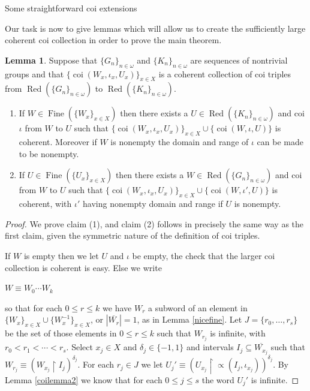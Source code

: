 \documentclass{amsart}
\theoremstyle{definition}\newtheorem{theorem}{Theorem}
\theoremstyle{definition}\newtheorem*{A}{Main Theorem}
\theoremstyle{definition}\newtheorem*{B}{Theorem \ref{elementaryequiv}}
\theoremstyle{definition}\newtheorem*{C}{Theorem \ref{continuous}}
\theoremstyle{definition}\newtheorem*{D}{Theorem \ref{bigisomorphism2}}
\theoremstyle{definition}\newtheorem{bigtheorem}{Main Theorem}
\numberwithin{theorem}{section}
\theoremstyle{definition}\newtheorem{corollary}[theorem]{Corollary}
\theoremstyle{definition}\newtheorem{proposition}[theorem]{Proposition}
\theoremstyle{definition}\newtheorem{definition}[theorem]{Definition}
\theoremstyle{definition}\newtheorem{question}[theorem]{Question}
\theoremstyle{definition}\newtheorem{example}[theorem]{Example}
\theoremstyle{definition}\newtheorem{remark}[theorem]{Remark}
\theoremstyle{definition}\newtheorem{note}[theorem]{Note}
\theoremstyle{definition}\newtheorem{lemma}[theorem]{Lemma}
\theoremstyle{definition}\newtheorem{fact}[theorem]{Fact}
\theoremstyle{definition}\newtheorem{define}[theorem]{Definition}
\theoremstyle{definition}\newtheorem{claim}[theorem]{Claim}
\theoremstyle{definition}\newtheorem{obs}[theorem]{Observation}
\theoremstyle{definition}\newtheorem{definitions}[theorem]{Definitions}
\newcommand{\Red}{\operatorname{Red}}
\newcommand{\Fine}{\operatorname{Fine}}
\newcommand{\coi}{\operatorname{coi}}
\begin{document}
\begin{section}{Some straightforward coi extensions}\label{uncomplicated}

Our task is now to give lemmas which will allow us to create the sufficiently large coherent coi collection in order to prove the main theorem.


\begin{lemma}\label{findsomerepresentative}  Suppose that $\{G_n\}_{n \in \omega}$ and $\{K_n\}_{n \in \omega}$ are sequences of nontrivial groups and that $\{\coi(W_x, \iota_x, U_x)\}_{x\in X}$ is a coherent collection of coi triples from $\Red(\{G_n\}_{n \in \omega})$ to $\Red(\{K_n\}_{n \in \omega})$.

\begin{enumerate}
\item  If $W \in \Fine(\{W_x\}_{x\in X})$ then there exists a $U \in \Red(\{K_n\}_{n \in \omega})$ and coi $\iota$ from $W$ to $U$ such that $\{\coi(W_x, \iota_x, U_x)\}_{x\in X} \cup \{\coi(W, \iota, U)\}$ is coherent.  Moreover if $W$ is nonempty the domain and range of $\iota$ can be made to be nonempty.

\item If $U \in \Fine(\{U_x\}_{x \in X})$ then there exists a $W \in \Red(\{G_n\}_{n \in \omega})$ and coi from $W$ to $U$ such that $\{\coi(W_x, \iota_x, U_x)\}_{x\in X} \cup \{\coi(W, \iota', U)\}$ is coherent, with $\iota'$ having nonempty domain and range if $U$ is nonempty.


\end{enumerate}


\end{lemma}

\begin{proof}  We prove claim (1), and claim (2) follows in precisely the same way as the first claim, given the symmetric nature of the definition of coi triples.

If $W$ is empty then we let $U$ and $\iota$ be empty, the check that the larger coi collection is coherent is easy.  Else we write 

\begin{center}

$W \equiv W_0 \cdots W_k$

\end{center}

\noindent so that for each $0 \leq r \leq k$ we have $W_r$ a subword of an element in $\{W_x\}_{x\in X} \cup \{W_x^{-1}\}_{x \in X}$, or $|\overline{W_r}| = 1$,  as in Lemma \ref{nicefine}.  Let $J = \{r_0, \ldots, r_s\}$ be the set of those elements in $0 \leq r \leq k$ such that $W_{r_j}$ is infinite, with $r_0 < r_1 < \cdots < r_s$.   Select $x_j \in X$ and $\delta_j \in \{-1, 1\}$ and intervals $I_j \subseteq \overline{W_{x_j}}$ such that $W_{r_j} \equiv (W_{x_j} \upharpoonright I_j)^{\delta_j}$.  For each $r_j \in J$ we let $U_j' \equiv (U_{x_j} \upharpoonright \varpropto(I_j, \iota_{x_j}))^{\delta_j}$.  By Lemma \ref{coilemma2} we know that for each $0 \leq j \leq s$ the word $U_j'$ is infinite.


\end{proof}
\end{section}
\end{document}
